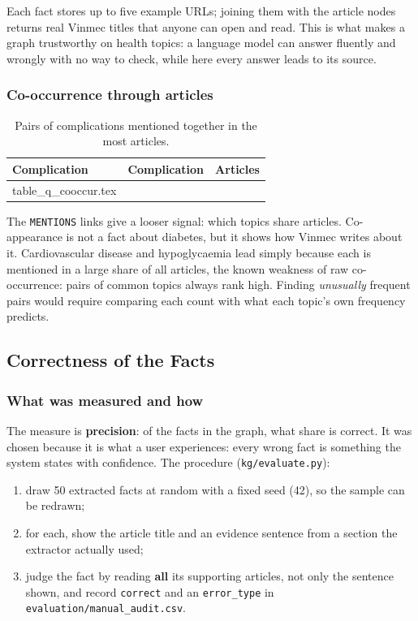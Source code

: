 \documentclass[11pt, a4paper]{article}
\makeatletter
\newcommand{\tabinput}[1]{\@@input #1 }   %
\newcommand{\code}[1]{\texttt{#1}}
\makeatother
\begin{document}
Each fact stores up to five example URLs; joining them with the article nodes returns real Vinmec titles that anyone can open and read. This is what makes a graph trustworthy on health topics: a language model can answer fluently and wrongly with no way to check, while here every answer leads to its source.

\subsubsection{Co-occurrence through articles}

\begin{table}[H]
\centering
\small
\caption{Pairs of complications mentioned together in the most articles.}
\label{tab:q-cooccur}
\begin{tabular}{l l r}
\toprule
Complication & Complication & Articles \\
\midrule
\tabinput{table_q_cooccur.tex}
\bottomrule
\end{tabular}
\end{table}

The \code{MENTIONS} links give a looser signal: which topics share articles. Co-appearance is not a fact about diabetes, but it shows how Vinmec writes about it. Cardiovascular disease and hypoglycaemia lead simply because each is mentioned in a large share of all articles, the known weakness of raw co-occurrence: pairs of common topics always rank high. Finding \emph{unusually} frequent pairs would require comparing each count with what each topic's own frequency predicts.

\subsection{Correctness of the Facts}
\label{sec:precision}

\subsubsection{What was measured and how}

The measure is \textbf{precision}: of the facts in the graph, what share is correct. It was chosen because it is what a user experiences: every wrong fact is something the system states with confidence. The procedure (\code{kg/evaluate.py}):
\begin{enumerate}
    \item draw 50 extracted facts at random with a fixed seed (42), so the sample can be redrawn;
    \item for each, show the article title and an evidence sentence from a section the extractor actually used;
    \item judge the fact by reading \textbf{all} its supporting articles, not only the sentence shown, and record \code{correct} and an \code{error\_type} in \code{evaluation/manual\_audit.csv}.
\end{enumerate}
\end{document}
